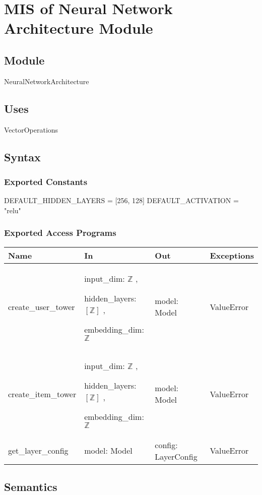 \documentclass[12pt, titlepage]{article}
\begin{document}
\section{MIS of Neural Network Architecture Module} \label{ModuleNNA}

\subsection{Module}

NeuralNetworkArchitecture

\subsection{Uses}
VectorOperations

\subsection{Syntax}

\subsubsection{Exported Constants}
DEFAULT\_HIDDEN\_LAYERS = [256, 128]
DEFAULT\_ACTIVATION = "relu"
\subsubsection{Exported Access Programs}

\begin{center}
\begin{tabular}{p{4cm} p{4cm} p{4cm} p{2cm}}
\hline
\textbf{Name} & \textbf{In} & \textbf{Out} & \textbf{Exceptions} \\
\hline
create\_user\_tower & input\_dim: $\mathbb{Z}$ ,

hidden\_layers: $[\mathbb{Z}]$ ,

embedding\_dim: $\mathbb{Z}$ & model: Model & ValueError \\
\hline
create\_item\_tower & input\_dim: $\mathbb{Z}$ ,

hidden\_layers: $[\mathbb{Z}]$ ,

embedding\_dim: $\mathbb{Z}$ & model: Model & ValueError \\
\hline
get\_layer\_config & model: Model & config: LayerConfig & ValueError \\
\hline
\end{tabular}
\end{center}

\subsection{Semantics}
\end{document}
